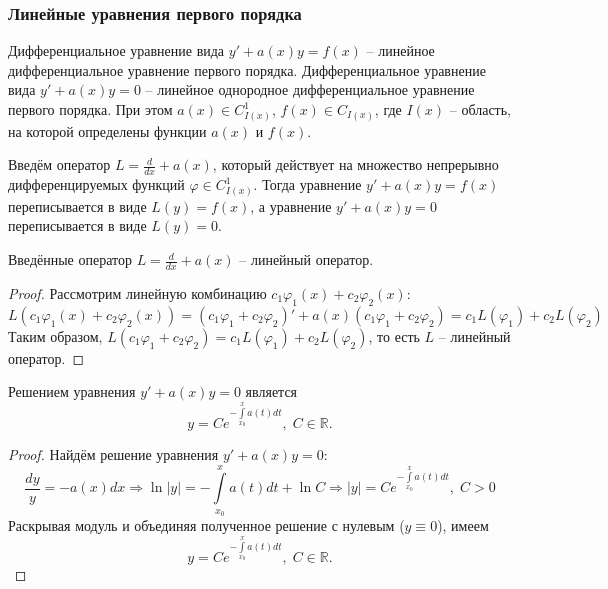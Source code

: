     \subsubsection{Линейные уравнения первого порядка}

    \begin{definition}
        Дифференциальное уравнение вида $y' + a(x) y = f(x)$ -- линейное дифференциальное уравнение первого порядка. Дифференциальное уравнение вида $y' + a(x) y = 0$ -- линейное однородное дифференциальное уравнение первого порядка. При этом $a(x) \in C_{I(x)}^1$, $f(x) \in C_{I(x)}$, где $I(x)$ -- область, на которой определены функции $a(x)$ и $f(x)$. 
    \end{definition}

    Введём оператор $L = \frac{d}{dx} + a(x)$, который действует на множество непрерывно дифференцируемых функций $\varphi \in C^1_{I(x)}$. Тогда уравнение $y' + a(x) y = f(x)$ переписывается в виде $L(y) = f(x)$, а уравнение $y' + a(x) y = 0$ переписывается в виде $L(y) = 0$.

    \begin{theorem}
        Введённые оператор $L = \frac{d}{dx} + a(x)$ -- линейный оператор.
    \end{theorem}

    \begin{proof}
        Рассмотрим линейную комбинацию $c_1 \varphi_1(x) + c_2 \varphi_2(x)$:
        \begin{equation}
            L(c_1 \varphi_1(x) + c_2 \varphi_2(x)) = (c_1 \varphi_1 + c_2 \varphi_2)' + a(x) (c_1 \varphi_1 + c_2 \varphi_2) = c_1 L(\varphi_1) + c_2 L(\varphi_2)
        \end{equation}
        Таким образом, $L(c_1 \varphi_1 + c_2 \varphi_2) = c_1 L(\varphi_1) + c_2 L(\varphi_2)$, то есть $L$ -- линейный оператор.
    \end{proof}

    \begin{proposition}
        Решением уравнения $y' + a(x) y = 0$ является
        \begin{equation}
            y = C e^{-\int\limits_{x_0}^{x} a(t) dt}, \; C \in \mathbb{R}.
        \end{equation}
    \end{proposition}

    \begin{proof}
        Найдём решение уравнения $y' + a(x) y = 0$: 
        \begin{equation}
            \frac{dy}{y} = -a(x) dx \Rightarrow \ln |y| = - \int\limits_{x_0}^{x} a(t) dt + \ln C \Rightarrow |y| = C e^{-\int\limits_{x_0}^{x} a(t) dt}, \; C > 0
        \end{equation}
        Раскрывая модуль и объединяя полученное решение с нулевым ($y \equiv 0$), имеем
        \begin{equation}
            y = C e^{-\int\limits_{x_0}^{x} a(t) dt}, \; C \in \mathbb{R}.
        \end{equation}
    \end{proof}

